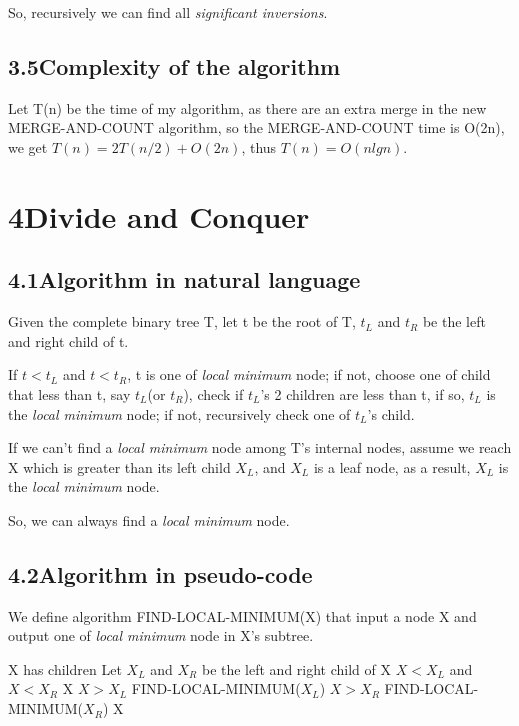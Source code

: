 \documentclass[a4paper,12pt]{article}
\begin{document}
So, recursively we can find all \textit{significant inversions}.

\subsection*{\textnormal{3.5\quad Complexity of the algorithm}}

Let T(n) be the time of my algorithm, as there are an extra merge in the new MERGE-AND-COUNT algorithm, so the MERGE-AND-COUNT time is O(2n), we get $T(n)=2T(n/2)+O(2n)$, thus $T(n)=O(nlgn)$.

\section*{4\quad Divide and Conquer}
\subsection*{\textnormal{4.1\quad Algorithm in natural language}}
Given the complete binary tree T, let t be the root of T, $t_L$ and $t_R$ be the left and right child of t.

If $t<t_L$ and $t<t_R$, t is one of \textit{local minimum} node; if not, choose one of child that less than t, say $t_L$(or $t_R$), check if $t_L$'s 2 children are less than t, if so, $t_L$ is the \textit{local minimum} node; if not, recursively check one of $t_L$'s child.

If we can't find a \textit{local minimum} node among T's internal nodes, assume we reach X which is greater than its left child $X_L$, and $X_L$ is a leaf node, as a result, $X_L$ is the \textit{local minimum} node.

So, we can always find a \textit{local minimum} node.

\subsection*{\textnormal{4.2\quad Algorithm in pseudo-code}}

We define algorithm FIND-LOCAL-MINIMUM(X) that input a node X and output one of \textit{local minimum} node in X's subtree.

\begin{codebox}
\li \If X has children
    \Then
\li Let $X_L$ and $X_R$ be the left and right child of X
\li \If $X<X_L$ and $X<X_R$
    \Then
\li \Return X
\li \ElseIf $X>X_L$
    \Then
\li \Return FIND-LOCAL-MINIMUM($X_L$)
\li \ElseIf $X>X_R$
    \Then
\li \Return FIND-LOCAL-MINIMUM($X_R$)
	\End
\li \Else
\li \Return X
	\End
\end{codebox}
\end{document}
